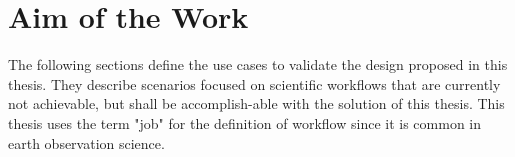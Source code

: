 \documentclass[draft,final]{vutinfth} %
\begin{document}

\section{Aim of the Work}\label{Aim}\label{Use Cases}
The following sections define the use cases to validate the design proposed in this thesis. They describe scenarios focused on scientific workflows that are currently not achievable, but shall be accomplish-able with the solution of this thesis. This thesis uses the term "job" for the definition of workflow since it is common in earth observation science.
\end{document}
